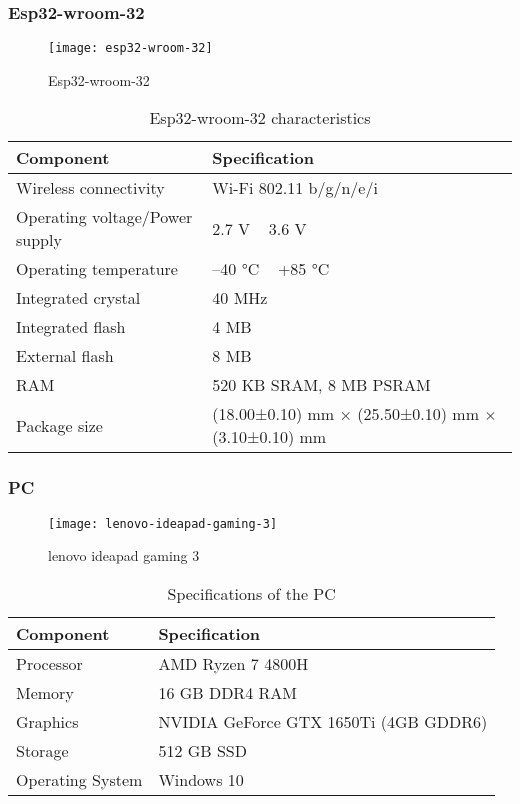 \subsubsection{Esp32-wroom-32}
\FloatBarrier
\begin{figure}[h]
         \centering
        \texttt{[image: esp32-wroom-32]}
   
        \caption{Esp32-wroom-32}
        \label{fig:esp32cam}
    \end{figure}
\FloatBarrier
\FloatBarrier
\begin{table}[h]
\centering
\begin{tabular}{|l|l|}
\hline
\textbf{Component} & \textbf{Specification} \\ \hline
Wireless connectivity & Wi-Fi 802.11 b/g/n/e/i \\ \hline
Operating voltage/Power supply & 2.7 V ~ 3.6 V \\ \hline
Operating temperature & –40 °C ~ +85 °C \\ \hline
Integrated crystal & 40 MHz \\ \hline
Integrated flash & 4 MB \\ \hline
External flash & 8 MB \\ \hline
RAM & 520 KB SRAM, 8 MB PSRAM \\ \hline
Package size & (18.00±0.10) mm × (25.50±0.10) mm × (3.10±0.10) mm \\ \hline
\end{tabular}
\caption{Esp32-wroom-32 characteristics \cite{E19}}
\label{table:esp32-wroom32-characteristics }
\end{table}
\FloatBarrier
\subsubsection{PC}
\FloatBarrier
\begin{figure}[h]
         \centering
        \texttt{[image: lenovo-ideapad-gaming-3]}
   
        \caption{lenovo ideapad gaming 3}
        \label{fig:lenovo-ideapad-gaming-3}
    \end{figure}
\FloatBarrier

\begin{table}[h]
\centering
\begin{tabular}{|l|l|}
\hline
\textbf{Component} & \textbf{Specification} \\ \hline
Processor & AMD Ryzen 7 4800H \\ \hline
Memory & 16 GB DDR4 RAM \\ \hline
Graphics & NVIDIA GeForce GTX 1650Ti (4GB GDDR6) \\ \hline
Storage & 512 GB SSD \\ \hline
Operating System & Windows 10 \\ \hline
\end{tabular}
\caption{Specifications of the PC}
\label{table:pc-specifications}
\end{table}

